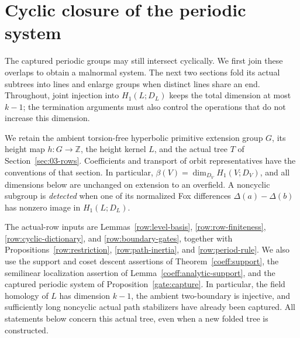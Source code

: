 \section{Cyclic closure of the periodic system}\label{sec:06-closure}

The captured periodic groups may still intersect cyclically. We first
join these overlaps to obtain a malnormal system. The next two sections
fold its actual subtrees into lines and enlarge groups when distinct
lines share an end. Throughout, joint injection into $H_1(L;D_L)$ keeps
the total dimension at most $k-1$; the termination arguments must also
control the operations that do not increase this dimension.

We retain the ambient torsion-free hyperbolic primitive extension group
$G$, its height map $h:G\to\mathbb Z$, the height kernel $L$, and the
actual tree $T$ of Section~\ref{sec:03-rows}. Coefficients and transport
of orbit representatives have the conventions of that section. In
particular, $\beta(V)=\dim_{D_V}H_1(V;D_V)$, and all dimensions below are
unchanged on extension to an overfield. A noncyclic subgroup is
\emph{detected} when one of its normalized Fox differences
$\Delta(a)-\Delta(b)$ has nonzero image in $H_1(L;D_L)$.

The actual-row inputs are Lemmas~\ref{row:level-basis},
\ref{row:row-finiteness}, \ref{row:cyclic-dictionary}, and
\ref{row:boundary-gates}, together with
Propositions~\ref{row:restriction}, \ref{row:path-inertia}, and
\ref{row:period-rule}. We also use the support and coset descent
assertions of Theorem~\ref{coeff:support}, the semilinear localization
assertion of Lemma~\ref{coeff:analytic-support}, and the captured
periodic system of Proposition~\ref{gate:capture}. In particular, the field homology of
$L$ has dimension $k-1$, the ambient two-boundary is injective, and
sufficiently long noncyclic actual path stabilizers have already been
captured. All statements below concern this actual tree, even when a
new folded tree is constructed.

